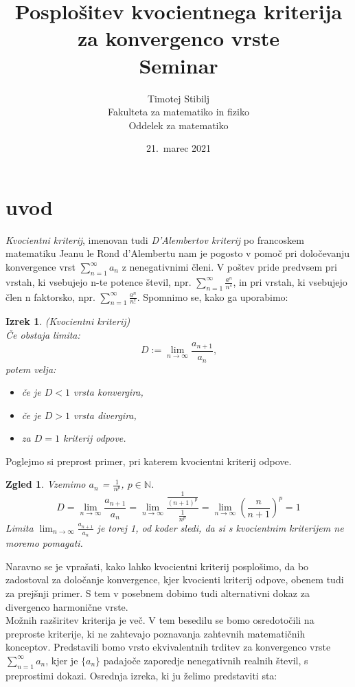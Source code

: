 \documentclass[a4paper,12pt]{article}
\title{Posplošitev kvocientnega kriterija za konvergenco vrste \\ 
\Large Seminar}
\author{Timotej Stibilj \\
Fakulteta za matematiko in fiziko \\
Oddelek za matematiko}
\date{21.\ marec 2021}
\def\N{\mathbb{N}} %
\newtheorem{izrek}{Izrek}
\newtheorem{zgled}{Zgled}
\begin{document}
\maketitle

\section{uvod}

\emph{Kvocientni kriterij}, imenovan tudi \emph{D'Alembertov kriterij} po francoskem matematiku Jeanu le Rond d'Alembertu
nam je pogosto v pomoč pri določevanju konvergence vrst $\sum_{n = 1}^{\infty}{a_n}$ z nenegativnimi členi. 
V poštev pride predvsem pri vrstah, ki vsebujejo n-te potence števil, npr. $\sum_{n = 1}^{\infty}{\frac{a^n}{n^s}}$, 
in pri vrstah, ki vsebujejo člen n faktorsko, npr. $\sum_{n = 1}^{\infty}{\frac{a^n}{n!}}$.
Spomnimo se, kako ga uporabimo:\\

\noindent
\begin{izrek}(Kvocientni kriterij)\\
    Če obstaja limita:
    \[
        D := \lim_{n \to \infty} \frac{a_{n + 1}}{a_n} \text{,}
    \]
    potem velja:
    \begin{itemize}
        \item če je $ D < 1 $ vrsta konvergira,
        \item če je $D > 1$ vrsta divergira,
        \item za $D = 1$ kriterij odpove.
    \end{itemize}
\end{izrek}

Poglejmo si preprost primer, pri katerem kvocientni kriterij odpove.

\begin{zgled}
    Vzemimo $a_n$ = $\frac{1}{n^p}$, $p \in \N$.
    \[
        D = \lim_{n \to \infty} \frac{a_{n + 1}}{a_n}
        = \lim_{n \to \infty} \frac{\frac{1}{(n+1)^p}}{\frac{1}{n^p}}
        = \lim_{n \to \infty} (\frac{n}{n + 1})^p
        = 1
    \]
    Limita $ \lim_{n \to \infty} \frac{a_{n + 1}}{a_n} $ je torej 1, od koder sledi, da si s kvocientnim kriterijem ne moremo pomagati.
\end{zgled}

Naravno se je vprašati, kako lahko kvocientni kriterij posplošimo, da bo zadostoval za določanje konvergence,
kjer kvocienti kriterij odpove, obenem tudi za prejšnji primer. S tem v posebnem dobimo tudi alternativni
dokaz za divergenco harmonične vrste.\\
Možnih razširitev kriterija je več. V tem besedilu se bomo osredotočili na preproste kriterije, ki ne
zahtevajo poznavanja zahtevnih matematičnih konceptov. Predstavili bomo vrsto ekvivalentnih trditev
za konvergenco vrste $\sum_{n = 1}^{\infty}{a_n}$, kjer je $\{a_n\}$ padajoče zaporedje nenegativnih realnih števil, s preprostimi dokazi. Osrednja
izreka, ki ju želimo predstaviti sta:
\end{document}
